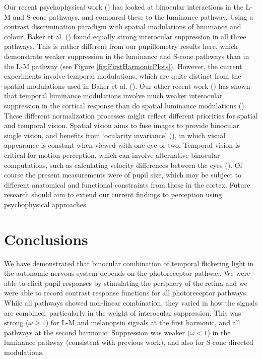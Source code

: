 \documentclass[
]{article}
\begin{document}
Our recent psychophysical work () has looked at binocular interactions in the L-M and S-cone pathways, and compared these to the luminance pathway. Using a contrast discrimination paradigm with spatial modulations of luminance and colour, Baker et al. () found equally strong interocular suppression in all three pathways. This is rather different from our pupillometry results here, which demonstrate weaker suppression in the luminance and S-cone pathways than in the L-M pathway (see Figure \ref{fig:FirstHarmonicPlots}). However, the current experiments involve temporal modulations, which are quite distinct from the spatial modulations used in Baker et al. (). Our other recent work () has shown that temporal luminance modulations involve much weaker interocular suppression in the cortical response than do spatial luminance modulations (). These different normalization processes might reflect different priorities for spatial and temporal vision. Spatial vision aims to fuse images to provide binocular single vision, and benefits from `ocularity invariance' (), in which visual appearance is constant when viewed with one eye or two. Temporal vision is critical for motion perception, which can involve alternative binocular computations, such as calculating velocity differences between the eyes (). Of course the present measurements were of pupil size, which may be subject to different anatomical and functional constraints from those in the cortex. Future research should aim to extend our current findings to perception using psychophysical approaches.

\section{Conclusions}\label{conclusions}

We have demonstrated that binocular combination of temporal flickering light in the autonomic nervous system depends on the photoreceptor pathway. We were able to elicit pupil responses by stimulating the periphery of the retina and we were able to record contrast response functions for all photoreceptor pathways. While all pathways showed non-linear combination, they varied in how the signals are combined, particularly in the weight of interocular suppression. This was strong (\(\omega \ge 1\)) for L-M and melanopsin signals at the first harmonic, and all pathways at the second harmonic. Suppression was weaker (\(\omega < 1\)) in the luminance pathway (consistent with previous work), and also for S-cone directed modulations.
\end{document}
